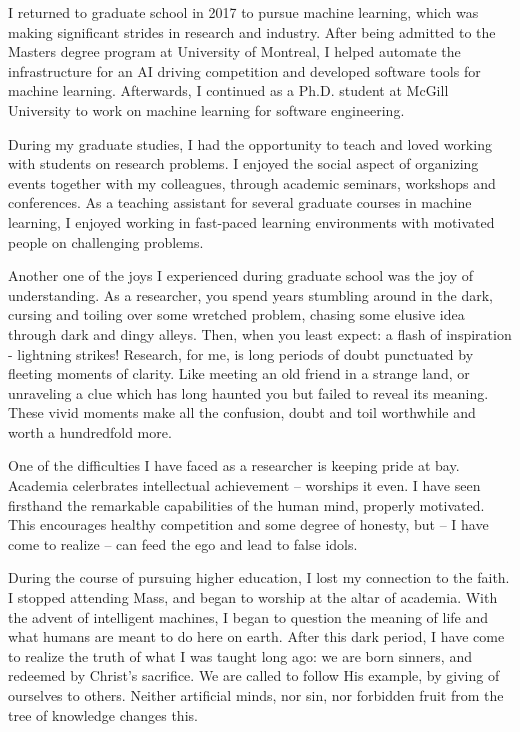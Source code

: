\documentclass[11pt]{article}
\begin{document}
I returned to graduate school in 2017 to pursue machine learning, which was making significant strides in research and industry. After being admitted to the Masters degree program at University of Montreal, I helped automate the infrastructure for an AI driving competition and developed software tools for machine learning. Afterwards, I continued as a Ph.D. student at McGill University to work on machine learning for software engineering.

During my graduate studies, I had the opportunity to teach and loved working with students on research problems. I enjoyed the social aspect of organizing events together with my colleagues, through academic seminars, workshops and conferences. As a teaching assistant for several graduate courses in machine learning, I enjoyed working in fast-paced learning environments with motivated people on challenging problems.

Another one of the joys I experienced during graduate school was the joy of understanding. As a researcher, you spend years stumbling around in the dark, cursing and toiling over some wretched problem, chasing some elusive idea through dark and dingy alleys. Then, when you least expect: a flash of inspiration - lightning strikes! Research, for me, is long periods of doubt punctuated by fleeting moments of clarity. Like meeting an old friend in a strange land, or unraveling a clue which has long haunted you but failed to reveal its meaning. These vivid moments make all the confusion, doubt and toil worthwhile and worth a hundredfold more.

One of the difficulties I have faced as a researcher is keeping pride at bay. Academia celerbrates intellectual achievement -- worships it even. I have seen firsthand the remarkable capabilities of the human mind, properly motivated. This encourages healthy competition and some degree of honesty, but -- I have come to realize -- can feed the ego and lead to false idols.

During the course of pursuing higher education, I lost my connection to the faith. I stopped attending Mass, and began to worship at the altar of academia. With the advent of intelligent machines, I began to question the meaning of life and what humans are meant to do here on earth. After this dark period, I have come to realize the truth of what I was taught long ago: we are born sinners, and redeemed by Christ's sacrifice. We are called to follow His example, by giving of ourselves to others. Neither artificial minds, nor sin, nor forbidden fruit from the tree of knowledge changes this.
\end{document}
